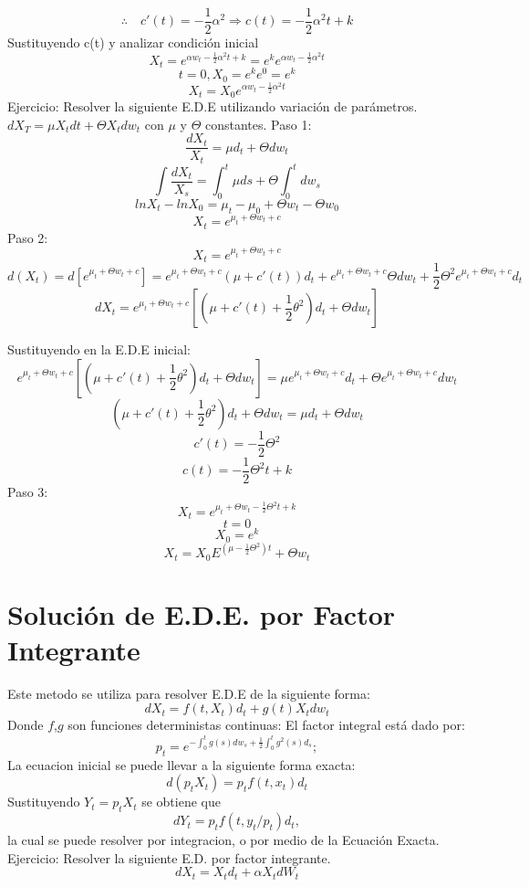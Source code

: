 \documentclass[11pt,fleqn]{book} %
\numberwithin{equation}{section} %
\numberwithin{figure}{section} %
\numberwithin{table}{section} %
\begin{document}
$$ \therefore \quad {c}'(t)=-\frac{1}{2}\alpha ^2 \Rightarrow c(t)=-\frac{1}{2}\alpha ^2t+k $$
Sustituyendo c(t) y analizar condición inicial
$$ X_t=e^{\alpha w_t-\frac{1}{2}\alpha ^2t+k}=e^ke^{\alpha w_t-\frac{1}{2}\alpha ^2t}$$
 $$t=0, X_0=e^ke^0=e^k$$
 $$X_t=X_0e^{\alpha w_t-\frac{1}{2}\alpha ^2t}$$ 
Ejercicio: Resolver la siguiente E.D.E utilizando variación de parámetros.
$dX_{T}=\mu X_tdt+\Theta X_tdw_t$ con $\mu$ y $\Theta$ constantes.
Paso 1:
$$ \frac{dX_t}{X_t}=\mu d_t+\Theta dw_t$$
$$\int \frac{dX_t}{X_s}=\int_{0}^{t}\mu ds+\Theta \int_{0}^{t}dw_s$$
$$lnX_t-lnX_0=\mu_t-\mu_0+\Theta w_t-\Theta w_0$$
$$X_t=e^{\mu _t+\Theta w_t+c} $$
Paso 2:
$$ X_t=e^{\mu _t+\Theta w_t+c}$$
$$d(X_t)=d[e^{\mu _t+\Theta w_t+c}] = e^{\mu _t+\Theta w_t+c}(\mu+{c}'(t))d_t+e^{\mu _t+\Theta w_t+c}\Theta dw_t+\frac{1}{2}\Theta ^2e^{\mu _t+\Theta w_t+c}d_t $$
$$dX_t=e^{\mu _t+\Theta w_t+c}[(\mu +{c}'(t)+\frac{1}{2}\theta ^2)d_t+\Theta dw_t] $$

Sustituyendo en la E.D.E inicial:
$$ e^{\mu _t+\Theta w_t+c}[(\mu +{c}'(t)+\frac{1}{2}\theta ^2)d_t+\Theta dw_t]=\mu e^{\mu _t+\Theta w_t+c}d_t+\Theta e^{\mu _t+\Theta w_t+c}dw_t $$
$$ (\mu +{c}'(t)+\frac{1}{2}\theta ^2)d_t+\Theta dw_t=\mu d_t+\Theta dw_t $$
$$ {c}'(t)=-\frac{1}{2}\Theta ^2 $$
$$ c(t)=-\frac{1}{2}\Theta ^2t+k $$
Paso 3:
$$ X_t=e^{\mu _t+\Theta w_t-\frac{1}{2}\Theta ^2t+k}$$
$$t=0$$
$$X_0=e^k$$
$$X_t=X_0E^{(\mu -\frac{1}{2}\Theta ^2)t}+\Theta w_t $$
\section{Solución de E.D.E. por Factor Integrante}
Este metodo se utiliza para resolver E.D.E de la siguiente forma:
$$dX_t=f(t,X_t)d_t+g(t)X_tdw_t$$
Donde $f$,$g$ son funciones deterministas continuas:
El factor integral está dado por:
$$p_t=e^{-\int_{0}^{t}g(s)dw_s+\frac{1}{2}\int_{0}^{t}g^2(s)d_s};$$
La ecuacion inicial se puede llevar a la siguiente forma exacta:
$$d(p_tX_t)=p_tf(t,x_t)d_t$$
Sustituyendo $Y_{t} = p_{t}X_{t}$ se obtiene que 
$$dY_t=p_tf(t,y_t/p_t)d_t,$$
la cual se puede resolver por integracion, o por medio de la Ecuación Exacta.
\ \\%
Ejercicio: Resolver la siguiente E.D. por factor integrante.
$$ dX_t=X_td_t+\alpha X_tdW_t $$
\end{document}
